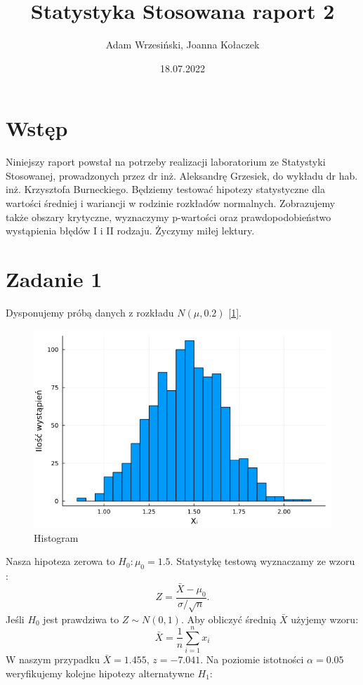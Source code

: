 \documentclass{article}
\title{Statystyka Stosowana raport 2}
\author{Adam Wrzesiński, Joanna Kołaczek}
\date{18.07.2022}
\theoremstyle{break}
\begin{document}
	\maketitle
	\tableofcontents
	\clearpage
\section*{Wstęp}
	
	Niniejszy raport powstał na potrzeby realizacji laboratorium ze Statystyki Stosowanej, prowadzonych przez dr inż. Aleksandrę Grzesiek, do wykładu dr hab. inż. Krzysztofa Burneckiego. Będziemy testować hipotezy statystyczne dla wartości średniej i wariancji w rodzinie rozkładów normalnych. Zobrazujemy także obszary krytyczne, wyznaczymy p-wartości oraz prawdopodobieństwo wystąpienia błędów I i II rodzaju. Życzymy miłej lektury.
	
\section*{Zadanie 1}
Dysponujemy próbą danych z rozkładu $N(\mu,0.2)$ [\ref{fig:hist}].
\begin{figure}[H]
	\begin{center}
		\includegraphics[scale=0.5]{hist1.png}
		\caption{Histogram}
		\label{fig:hist}
	\end{center}
\end{figure}
Nasza hipoteza zerowa to $H_0: \mu_0 = 1.5$. Statystykę testową wyznaczamy ze wzoru :
$$Z = \frac{\bar{X}-\mu_0}{\sigma/\sqrt{n}}.$$
Jeśli $H_0$ jest prawdziwa to $Z\sim N(0,1)$. Aby obliczyć średnią $\bar{X}$ użyjemy wzoru:
$$\bar{X}=\frac{1}{n}\sum\limits_{i=1}^{n}x_i$$
W naszym przypadku $\bar{X}=1.455$, $z=-7.041$.
Na poziomie istotności $\alpha = 0.05$ weryfikujemy kolejne hipotezy alternatywne $H_1$:
\end{document}
